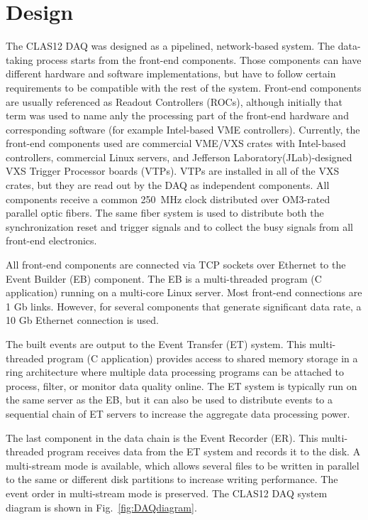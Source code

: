 \section{Design}

The CLAS12 DAQ was designed as a pipelined, network-based system. The data-taking process starts from the front-end components. Those components can have different hardware and software implementations, but have to follow certain requirements to be compatible with the rest of the system. Front-end components are usually referenced as Readout Controllers (ROCs), although initially that term was used to name anly the processing part of the front-end hardware and corresponding software (for example Intel-based VME controllers). Currently, the front-end components used are commercial VME/VXS crates with Intel-based controllers, commercial Linux servers, and Jefferson Laboratory(JLab)-designed VXS Trigger Processor boards (VTPs). VTPs are installed in all of the VXS crates, but they are read out by the DAQ as independent components. All components receive a common 250~MHz clock distributed over OM3-rated parallel optic fibers. The same fiber system is used to distribute both the synchronization reset and trigger signals and to collect the busy signals from all front-end electronics.

All front-end components are connected via TCP sockets over Ethernet to the Event Builder (EB) component. The EB is a multi-threaded program (C application) running on a multi-core Linux server. Most front-end connections are 1 Gb links. However, for several components that generate significant data rate, a 10 Gb Ethernet connection is used.

The built events are output to the Event Transfer (ET) system. This multi-threaded program (C application) provides access to shared memory storage in a ring architecture where multiple data processing programs can be attached to process, filter, or monitor data quality online. The ET system is typically run on the same server as the EB, but it can also be used to distribute events to a sequential chain of ET servers to increase the aggregate data processing power.

The last component in the data chain is the Event Recorder (ER). This multi-threaded program receives data from the ET system and records it to the disk. A multi-stream mode is available, which allows several files to be written in parallel to the same or different disk partitions to increase writing performance. The event order in multi-stream mode is preserved. The CLAS12 DAQ system diagram is shown in Fig.~\ref{fig:DAQdiagram}.

